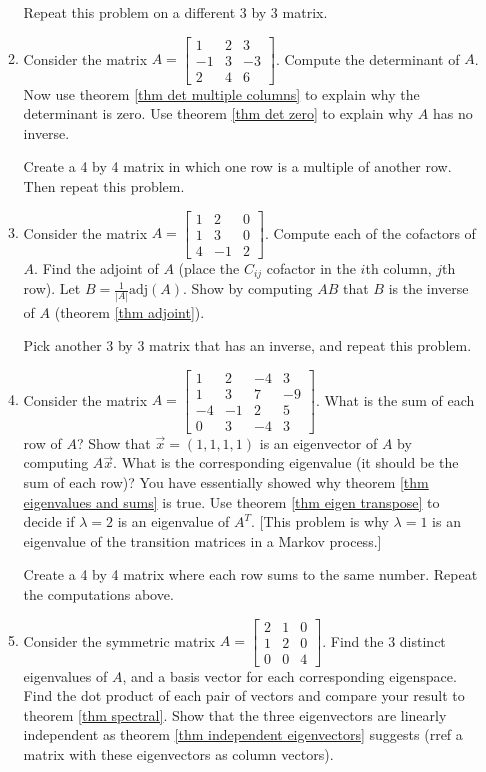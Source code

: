 \begin{enumerate}
\begin{enumerate}
Repeat this problem on a different 3 by 3 matrix.
  
  \item Consider the matrix 
  $A = 
\begin{bmatrix}
1&2&3\\
-1&3&-3\\
2&4&6
\end{bmatrix}
$. Compute the determinant of $A$.  Now use theorem \ref{thm det multiple columns} to explain why the determinant is zero. Use theorem \ref{thm det zero} to explain why $A$ has no inverse.
  
  Create a 4 by 4 matrix in which one row is a multiple of another row. Then repeat this problem. 
  
  \item Consider the matrix 
  $A = 
\begin{bmatrix}
1&2&0\\
1&3&0\\
4&-1&2
\end{bmatrix}
$. 
Compute each of the cofactors of $A$. Find the adjoint of $A$ (place the $C_{ij}$ cofactor in the $i$th column, $j$th row). Let $B=\frac{1}{|A|}\text{adj}(A)$. Show by computing $AB$ that $B$ is the inverse of $A$ (theorem \ref{thm adjoint}).

Pick another 3 by 3 matrix that has an inverse, and repeat this problem.
	

	\item Consider the matrix   $A = 
\begin{bmatrix}
1&2&-4&3\\
1&3&7&-9\\
-4&-1&2&5\\
0&3&-4&3
\end{bmatrix}
$. 
What is the sum of each row of $A$? Show that $\vec x = (1,1,1,1)$ is an eigenvector of $A$ by computing $A\vec x$. What is the corresponding eigenvalue (it should be the sum of each row)? You have essentially showed why theorem \ref{thm eigenvalues and sums} is true. Use theorem \ref{thm eigen transpose} to decide if $\lambda=2$ is an eigenvalue of $A^T$. [This problem is why $\lambda =1 $ is an eigenvalue of the transition matrices in a Markov process.]
	
	Create a 4 by 4 matrix where each row sums to the same number.  Repeat the computations above.
	
	\item Consider the symmetric matrix 
  $A = 
\begin{bmatrix}
2&1&0\\
1&2&0\\
0&0&4
\end{bmatrix}
$. 
Find the 3 distinct eigenvalues of $A$, and a basis vector for each corresponding eigenspace. Find the dot product of each pair of vectors and compare your result to theorem \ref{thm spectral}.  Show that the three eigenvectors are linearly independent  as theorem \ref{thm independent eigenvectors} suggests (rref a matrix with these eigenvectors as column vectors).


\end{enumerate}
\end{enumerate}
